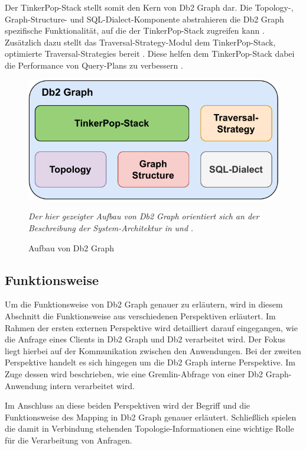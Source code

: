 Der TinkerPop-Stack stellt somit den Kern von Db2 Graph dar. Die Topology-, Graph-Structure- und SQL-Dialect-Komponente abstrahieren die Db2 Graph spezifische Funktionalität, auf die der TinkerPop-Stack zugreifen kann \cite{sigmod_tian}. Zusätzlich dazu stellt das Traversal-Strategy-Modul dem TinkerPop-Stack, optimierte Traversal-Strategies bereit \cite{sigmod_tian}. Diese helfen dem TinkerPop-Stack dabei die Performance von Query-Plans zu verbessern \cite{sigmod_tian}.  

\begin{figure}[ht]
    \centering
    \includegraphics[width=\textwidth]{images/db2graph_components.pdf}
    \caption{Aufbau von Db2 Graph}
    \label{fig:db2graph_aufbau}
    \vspace{0.5em}
    \textit{Der hier gezeigter Aufbau von Db2 Graph   orientiert sich an der Beschreibung der System-Architektur in} \cite{vldb_tian} \textit{und} \cite{sigmod_tian}\textit{.}
\end{figure}

\subsection{Funktionsweise}
\label{db2graph:funktionsweise}
Um die Funktionsweise von Db2 Graph genauer zu erläutern, wird in diesem Abschnitt die Funktionsweise aus verschiedenen Perspektiven erläutert. Im Rahmen der ersten externen Perspektive wird detailliert darauf eingegangen, wie die Anfrage eines Clients in Db2 Graph und Db2 verarbeitet wird. Der Fokus liegt hierbei auf der Kommunikation zwischen den Anwendungen. Bei der zweiten Perspektive handelt es sich hingegen um die Db2 Graph interne Perspektive. Im Zuge dessen wird beschrieben, wie eine Gremlin-Abfrage von einer Db2 Graph-Anwendung intern verarbeitet wird. 

Im Anschluss an diese beiden Perspektiven wird der Begriff und die Funktionsweise des Mapping in Db2 Graph genauer erläutert. Schließlich spielen die damit in Verbindung stehenden Topologie-Informationen eine wichtige Rolle für die Verarbeitung von Anfragen.

